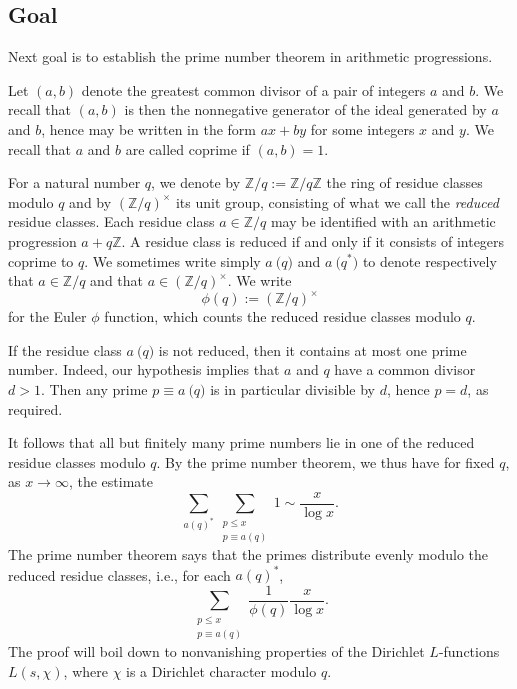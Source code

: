 \documentclass[reqno]{amsart}  \numberwithin{theorem}{section} \numberwithin{equation}{section}
\begin{document}
\subsection{Goal}
Next goal is to establish the prime number theorem in arithmetic progressions.

Let $(a,b)$ denote the greatest common divisor of a pair of integers $a$ and $b$.  We recall that $(a,b)$ is then the nonnegative generator of the ideal generated by $a$ and $b$, hence may be written in the form $a x + b y$ for some integers $x$ and $y$.  We recall that $a$ and $b$ are called coprime if $(a,b) = 1$.

For a natural number $q$, we denote by $\mathbb{Z} / q := \mathbb{Z} / q \mathbb{Z}$ the ring of residue classes modulo $q$ and by $(\mathbb{Z} / q)^\times$ its unit group, consisting of what we call the \emph{reduced} residue classes.  Each residue class $a \in \mathbb{Z} / q$ may be identified with an arithmetic progression $a + q \mathbb{Z}$.  A residue class is reduced if and only if it consists of integers coprime to $q$.  We sometimes write simply $a \pod{q}$ and $a \pod{q}^*$ to denote respectively that $a \in \mathbb{Z} / q$ and that $a \in (\mathbb{Z} / q)^\times$.  We write
\begin{equation*}
  \phi(q) := (\mathbb{Z} / q) ^\times
\end{equation*}
for the Euler $\phi$ function, which counts the reduced residue classes modulo $q$.

If the residue class $a \pod{q}$ is not reduced, then it contains at most one prime number.  Indeed, our hypothesis implies that $a$ and $q$ have a common divisor $d > 1$.  Then any prime $p \equiv a \pod{q}$ is in particular divisible by $d$, hence $p = d$, as required.

It follows that all but finitely many prime numbers lie in one of the reduced residue classes modulo $q$.  By the prime number theorem, we thus have for fixed $q$, as $x \rightarrow \infty$, the estimate
\begin{equation*}
  \sum_{a (q)^*} \sum_{
    \substack{
      p \leq x  \\
      p \equiv  a(q)
    }
  }
  1
  \sim \frac{x}{ \log x}.
\end{equation*}
The prime number theorem says that the primes distribute evenly modulo the reduced residue classes, i.e., for each $a(q)^*$,
\begin{equation*}
  \sum_{
    \substack{
      p \leq x  \\
      p \equiv a (q)
    }
  }
  \frac{1}{\phi(q)}
  \frac{x}{\log x}.
\end{equation*}
The proof will boil down to nonvanishing properties of the Dirichlet $L$-functions $L(s,\chi)$, where $\chi$ is a Dirichlet character modulo $q$.
\end{document}
